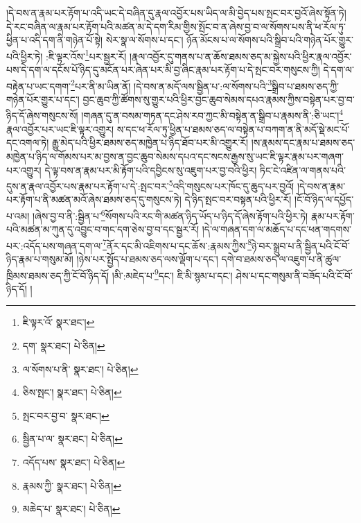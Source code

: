 །དེ་བས་ན་རྣམ་པར་རྟོག་པ་འདི་ཡང་དེ་བཞིན་དུ་རྣལ་འབྱོར་པས་ཡིད་ལ་མི་བྱེད་པས་སྤང་བར་བྱའོ་ཞེས་སྟོན་ཏེ། དེ་རང་བཞིན་ལ་རྣམ་པར་རྟོག་པའི་མཚན་མ་དེ་དག་རིམ་གྱིས་སྤོང་བ་ན་ཞེས་བྱ་བ་ལ་སོགས་པས་ནི་ཕ་རོལ་ཏུ་ཕྱིན་པ་འདི་དག་ནི་གཉེན་པོ་སྟེ། སེར་སྣ་ལ་སོགས་པ་དང་། ཉོན་མོངས་པ་ལ་སོགས་པའི་སྒྲིབ་པའི་གཉེན་པོར་གྱུར་པའི་ཕྱིར་ཏེ། :ཇི་ལྟར་འོས་\footnote{ཇི་ལྟར་འོ་  སྣར་ཐང་། }པར་སྦྱར་རོ། །རྣལ་འབྱོར་དུ་གནས་པ་ན་ཆོས་ཐམས་ཅད་མ་སྐྱེས་པའི་ཕྱིར་རྣལ་འབྱོར་པས་དེ་དག་ལ་དངོས་པོ་ཉིད་དུ་མངོན་པར་ཞེན་པར་མི་བྱ་ཞིང་རྣམ་པར་རྟོག་པ་དེ་སྤང་བར་གསུངས་ཀྱི། དེ་དག་ལ་བརྟེན་པ་ཡང་དགག་\footnote{དག་  སྣར་ཐང་།  པེ་ཅིན། }པར་ནི་མ་ཡིན་ནོ། །དེ་བས་ན་མདོ་ལས་སྦྱིན་པ་:ལ་སོགས་པའི་\footnote{ལ་སོགས་པ་ནི་  སྣར་ཐང་།  པེ་ཅིན། }སྒྲིབ་པ་ཐམས་ཅད་ཀྱི་གཉེན་པོར་གྱུར་པ་དང་། བྱང་ཆུབ་ཀྱི་ཚོགས་སུ་གྱུར་པའི་ཕྱིར་བྱང་ཆུབ་སེམས་དཔའ་རྣམས་ཀྱིས་བསྟེན་པར་བྱ་བ་ཉིད་དོ་ཞེས་གསུངས་སོ། །གཞན་དུ་ན་བསམ་གཏན་དང་ཤེས་རབ་ཀྱང་མི་བསྟེན་ན་སྒྲིབ་པ་རྣམས་ནི་:ཅི་ཡང་།\footnote{ཅིས་སྤང་།  སྣར་ཐང་།  པེ་ཅིན། } རྣལ་འབྱོར་པར་ཡང་ཇི་ལྟར་འགྱུར། ས་དང་ཕ་རོལ་ཏུ་ཕྱིན་པ་ཐམས་ཅད་ལ་བསྟེན་པ་བཀག་ན་ནི་མདོ་སྡེ་མང་པོ་དང་འགལ་ཏེ། རྒྱུ་མེད་པའི་ཕྱིར་ཐམས་ཅད་མཁྱེན་པ་ཉིད་ཐོབ་པར་མི་འགྱུར་རོ། །ས་རྣམས་དང་རྣམ་པ་ཐམས་ཅད་མཁྱེན་པ་ཉིད་ལ་གོམས་པར་མ་བྱས་ན་བྱང་ཆུབ་སེམས་དཔའ་དང་སངས་རྒྱས་སུ་ཡང་ཇི་ལྟར་རྣམ་པར་གཞག་པར་འགྱུར། དེ་ལྟ་བས་ན་རྣམ་པར་མི་རྟོག་པའི་དབྱིངས་སུ་འཇུག་པར་བྱ་བའི་ཕྱིར། ཏིང་ངེ་འཛིན་ལ་གནས་པའི་དུས་ན་རྣལ་འབྱོར་པས་རྣམ་པར་རྟོག་པ་དེ་:སྤང་བར་\footnote{སྤང་བར་བྱ་བ་  སྣར་ཐང་། }འདི་གསུངས་པར་ཁོང་དུ་ཆུད་པར་བྱའོ། །དེ་བས་ན་རྣམ་པར་རྟོག་པ་ནི་མཚན་མའོ་ཞེས་ཐམས་ཅད་དུ་གསུངས་ཏེ། དེ་ཉིད་སྤང་བར་བསྟན་པའི་ཕྱིར་རོ། །ངོ་བོ་ཉིད་ལ་དཔྱོད་པ་འམ། །ཞེས་བྱ་བ་ནི་:སྦྱིན་པ་\footnote{སྦྱིན་པ་ལ་  སྣར་ཐང་།  པེ་ཅིན། }སོགས་པའི་རང་གི་མཚན་ཉིད་ཡོད་པ་ཉིད་དོ་ཞེས་རྟོག་པའི་ཕྱིར་ཏེ། རྣམ་པར་རྟོག་པའི་མཚན་མ་ཀུན་དུ་འབྱུང་བ་གང་དག་ཅེས་བྱ་བ་དང་སྦྱར་རོ། །དེ་ལ་གཞན་དག་ལ་མཆོད་པ་དང་ཕན་གདགས་པར་:འདོད་པས་གཞན་དག་ལ་\footnote{འདོད་པས་  སྣར་ཐང་།  པེ་ཅིན། }ནོར་དང་མི་འཇིགས་པ་དང་ཆོས་:རྣམས་ཀྱིས་\footnote{རྣམས་ཀྱི་  སྣར་ཐང་།  པེ་ཅིན། }ཉེ་བར་སྒྲུབ་པ་ནི་སྦྱིན་པའི་ངོ་བོ་ཉིད་རྣམ་པ་གསུམ་མོ། །ཉེས་པར་སྤྱོད་པ་ཐམས་ཅད་ལས་ལྡོག་པ་དང་། དགེ་བ་ཐམས་ཅད་ལ་འཇུག་པ་ནི་ཚུལ་ཁྲིམས་ཐམས་ཅད་ཀྱི་ངོ་བོ་ཉིད་དོ། །མི་:མཇེད་པ་\footnote{མཆེད་པ་  སྣར་ཐང་།  པེ་ཅིན། }དང་། ཇི་མི་སྙམ་པ་དང་། ཤེས་པ་དང་གསུམ་ནི་བཟོད་པའི་ངོ་བོ་ཉིད་དོ། །
